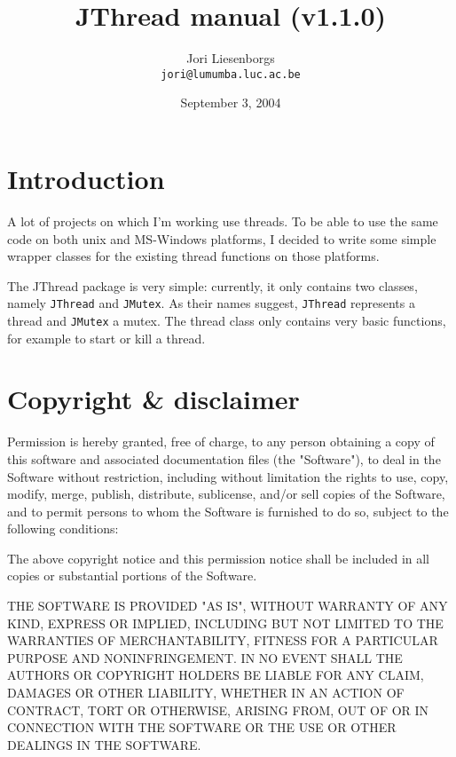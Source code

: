 \documentclass[a4paper,12pt]{article}
\begin{document}
	\title{JThread manual (v1.1.0)}
	\author{Jori Liesenborgs\\
	        {\tt jori@lumumba.luc.ac.be} }
	\date{September 3, 2004}
	\maketitle

	\section{Introduction}

	A lot of projects on which I'm working use threads. To be able to
	use the same code on both unix and MS-Windows platforms, I decided
	to write some simple wrapper classes for the existing thread functions
	on those platforms.

	The JThread package is very simple: currently, it only contains two
	classes, namely {\tt JThread} and {\tt JMutex}. As their names 
	suggest, {\tt JThread} represents a thread and {\tt JMutex} a mutex.
	The thread class only contains very basic functions, for example to
	start or kill a thread.

	\section{Copyright \& disclaimer}

	Permission is hereby granted, free of charge, to any person obtaining a
	copy of this software and associated documentation files (the "Software"),
	to deal in the Software without restriction, including without limitation
	the rights to use, copy, modify, merge, publish, distribute, sublicense,
	and/or sell copies of the Software, and to permit persons to whom the
	Software is furnished to do so, subject to the following conditions:

	The above copyright notice and this permission notice shall be included
	in all copies or substantial portions of the Software.

	THE SOFTWARE IS PROVIDED "AS IS", WITHOUT WARRANTY OF ANY KIND, EXPRESS
	OR IMPLIED, INCLUDING BUT NOT LIMITED TO THE WARRANTIES OF MERCHANTABILITY,
	FITNESS FOR A PARTICULAR PURPOSE AND NONINFRINGEMENT.  IN NO EVENT SHALL
	THE AUTHORS OR COPYRIGHT HOLDERS BE LIABLE FOR ANY CLAIM, DAMAGES OR OTHER
	LIABILITY, WHETHER IN AN ACTION OF CONTRACT, TORT OR OTHERWISE, ARISING
	FROM, OUT OF OR IN CONNECTION WITH THE SOFTWARE OR THE USE OR OTHER DEALINGS
	IN THE SOFTWARE.
\end{document}
